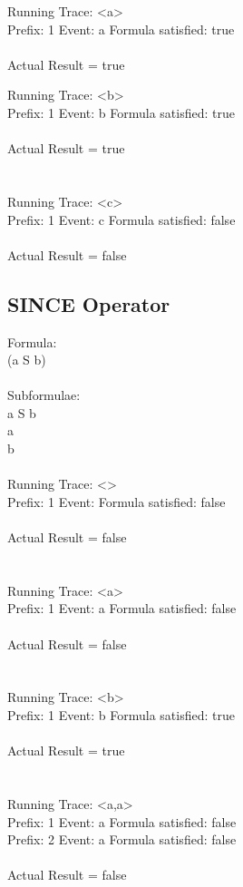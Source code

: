 \noindent Running Trace: \textless a\textgreater\\
  Prefix: 1 Event: a Formula satisfied: true\\
\\
Actual Result = true\\

\newpage

\noindent Running Trace: \textless b\textgreater\\
  Prefix: 1 Event: b Formula satisfied: true\\
\\
Actual Result = true\\
\\
\\
Running Trace: \textless c\textgreater\\
  Prefix: 1 Event: c Formula satisfied: false\\
\\
Actual Result = false\\

\subsection{SINCE Operator}

Formula:\\
(a S b)\\
\\
Subformulae:\\
a S b\\
a\\
b\\
\\
Running Trace: \textless \textgreater\\
  Prefix: 1 Event:  Formula satisfied: false\\
\\
Actual Result = false\\
\\
\\
Running Trace: \textless a\textgreater\\
  Prefix: 1 Event: a Formula satisfied: false\\
\\
Actual Result = false\\
\\
\\
Running Trace: \textless b\textgreater\\
  Prefix: 1 Event: b Formula satisfied: true\\
\\
Actual Result = true\\
\\
\\
Running Trace: \textless a,a\textgreater\\
  Prefix: 1 Event: a Formula satisfied: false\\
  Prefix: 2 Event: a Formula satisfied: false\\
\\
Actual Result = false\\

